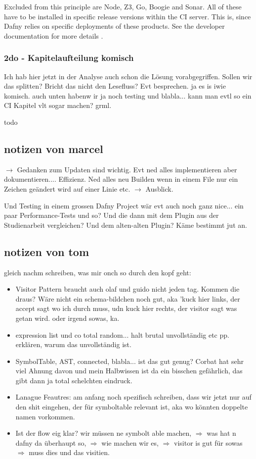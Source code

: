 Excluded from this principle are Node, Z3, Go, Boogie and Sonar. All of these have to be installed in specific release versions within the CI server. This is, since Dafny relies on specific deployments of these products. See the developer documentation for more details \cite{dev}. \\

\subsubsection{2do - Kapitelaufteilung komisch}
Ich hab hier jetzt in der Analyse auch schon die Lösung vorabgegriffen. Sollen wir das splitten? Bricht das nicht den Lesefluss? Evt besprechen.
ja es is iwie komisch. auch unten habenw ir ja noch testing und blabla... kann man evtl so ein CI Kapitel vlt sogar machen? grml.

todo


\subsection{notizen von marcel}

$\rightarrow$ Gedanken zum Updaten sind wichtig. Evt ned alles implementieren aber dokumentieren.... Effizienz. Ned alles neu Builden
wenn in einem File nur ein Zeichen geändert wird auf einer Linie etc. $\rightarrow$ Ausblick.

Und Testing in einem grossen Dafny Project wär evt auch noch ganz nice... ein paar Performance-Tests und so?
Und die dann mit dem Plugin aus der Studienarbeit vergleichen? Und dem alten-alten Plugin? Käme bestimmt jut an.


\subsection{notizen von tom}
gleich nachm schreiben, was mir onch so durch den kopf geht:
\begin{itemize}
    \item Visitor Pattern braucht auch olaf und guido nicht jeden tag. Kommen die draus? Wäre nicht ein schema-bildchen noch gut, aka 'kuck hier links, der accept sagt wo ich durch muss, udn kuck hier rechts, der visitor sagt was getan wird. oder irgend sowas, ka.
    \item expression list und co total random... halt brutal unvollständig etc pp. erklären, warum das unvollständig ist.
    \item SymbolTable, AST, connected, blabla... ist das gut genug? Corbat hat sehr viel Ahnung davon und mein Halbwissen ist da ein bisschen gefährlich, das gibt dann ja total schelchten eindruck.
    \item Lanague Feautres: am anfang noch spezifisch schreiben, dass wir jetzt nur auf den shit eingehen, der für symboltable relevant ist, aka wo könnten doppelte namen vorkommen.
    \item Ist der flow eig klar? wir müssen ne symbolt able machen, $\Rightarrow$ was hat n dafny da überhaupt so, $\Rightarrow$ wie machen wir es, $\Rightarrow$ visitor is gut für sowas $\Rightarrow$ muss dies und das visitien.
\end{itemize}
